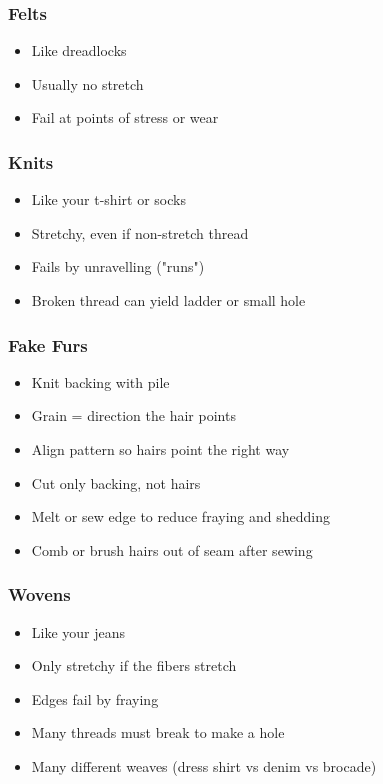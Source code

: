 \documentclass{beamer}
\begin{document}
\begin{frame}[fragile]
\frametitle{Felts}
\begin{itemize}[<+(1)->]
\item Like dreadlocks
\item Usually no stretch
\item Fail at points of stress or wear
\end{itemize}
\end{frame}

\begin{frame}[fragile]
\frametitle{Knits}
\begin{itemize}[<+(1)->]
\item Like your t-shirt or socks
\item Stretchy, even if non-stretch thread
\item Fails by unravelling ("runs")
\item Broken thread can yield ladder or small hole
\end{itemize}
\end{frame}

\begin{frame}[fragile]
\frametitle{Fake Furs}
\begin{itemize}[<+(1)->]
\item Knit backing with pile
\item Grain = direction the hair points
\item Align pattern so hairs point the right way
\item Cut only backing, not hairs
\item Melt or sew edge to reduce fraying and shedding
\item Comb or brush hairs out of seam after sewing
\end{itemize}
\end{frame}

\begin{frame}[fragile]
\frametitle{Wovens}
\begin{itemize}[<+(1)->]
\item Like your jeans
\item Only stretchy if the fibers stretch
\item Edges fail by fraying
\item Many threads must break to make a hole
\item Many different weaves (dress shirt vs denim vs brocade)
\end{itemize}
\end{frame}
\end{document}
